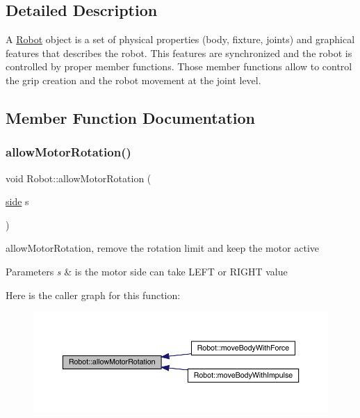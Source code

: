 \subsection{Detailed Description}
A \mbox{\hyperlink{class_robot}{Robot}} object is a set of physical properties (body, fixture, joints) and graphical features that describes the robot. This features are synchronized and the robot is controlled by proper member functions. Those member functions allow to control the grip creation and the robot movement at the joint level. 

\subsection{Member Function Documentation}
\mbox{\label{class_robot_afd7710fdb80993a6b6cc1aa9b88ed06a}} 
\subsubsection{\texorpdfstring{allow\+Motor\+Rotation()}{allowMotorRotation()}}
{\footnotesize\ttfamily void Robot\+::allow\+Motor\+Rotation (\begin{DoxyParamCaption}\item[{\mbox{\hyperlink{_robot_8h_afc015eff6557e84151d2e53b94375445}{side}}}]{s }\end{DoxyParamCaption})}

allow\+Motor\+Rotation, remove the rotation limit and keep the motor active 
\begin{DoxyParams}{Parameters}
{\em s} & is the motor side can take L\+E\+FT or R\+I\+G\+HT value \\
\hline
\end{DoxyParams}
Here is the caller graph for this function\+:\nopagebreak
\begin{figure}[H]
\begin{center}
\leavevmode
\includegraphics[width=350pt]{class_robot_afd7710fdb80993a6b6cc1aa9b88ed06a_icgraph}
\end{center}
\end{figure}
\mbox{\label{class_robot_af11fa20795b6b4d07811f3d3089beb48}} 
